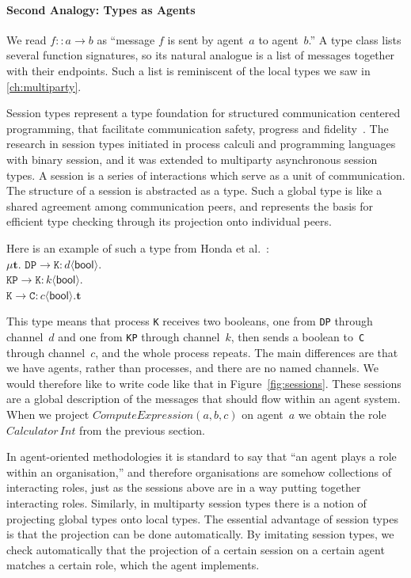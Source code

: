 \documentclass[a4paper,12pt,oneside,fleqn]{book} %
\begin{document}
{\def\l#1->#2:#3<#4>{\mathtt{#1}\to\mathtt{#2}:#3\langle\mathsf{#4}\rangle}
\paragraph{Second Analogy: Types as Agents} We read $f::a\to b$ as
``message $f$ is sent by agent~$a$ to agent~$b$.'' A type class lists
several function signatures, so its natural analogue is a list of messages
together with their endpoints. Such a list is reminiscent of the
local types we saw in \autoref{ch:multiparty}.


Session types represent a type foundation for structured communication
centered programming, that facilitate communication safety, progress and
fidelity~\cite{dblp:conf/popl/hondayc08}. The research in session types
initiated in process calculi and programming languages with binary session,
and it was extended to multiparty asynchronous session types. A session is
a series of interactions which serve as a unit of communication. The
structure of a session is abstracted as a type. Such a global type is like
a shared agreement among communication peers, and represents the basis for
efficient type checking through its projection onto individual peers.



Here is an example of such a type from
Honda et al.~\cite{dblp:conf/popl/hondayc08}:\\
$\mu\mathbf{t}.$
  $\l DP->K:d<bool>. $\\
  $\l KP->K:k<bool>. $\\
  $\l K->C:c<bool>.\mathbf{t}$

This type means that process \texttt{K} receives two booleans, one from
\texttt{DP} through channel~$d$ and one from \texttt{KP} through channel~$k$,
then sends a boolean to~\texttt{C} through channel~$c$, and the whole process
repeats. The main differences are that we have agents, rather than processes,
and there are no named channels. We would therefore like to write code like
that in Figure~\ref{fig:sessions}.  These sessions are a global description of
the messages that should flow within an agent system. When we project
$\mathit{ComputeExpression}(a,b,c)$ on agent~$a$ we obtain the role
$\mathit{Calculator}\,\mathit{Int}$ from the previous section.}

In agent-oriented methodologies it is standard to say that ``an agent plays
a role within an organisation,'' and therefore organisations are somehow
collections of interacting roles, just as the sessions above are in a way
putting together interacting roles. Similarly, in multiparty session types
there is a notion of projecting global types onto local types. The
essential advantage of session types is that the projection can be done
automatically. By imitating session types, we check automatically that the
projection of a certain session on a certain agent matches a certain role,
which the agent implements.
\end{document}
